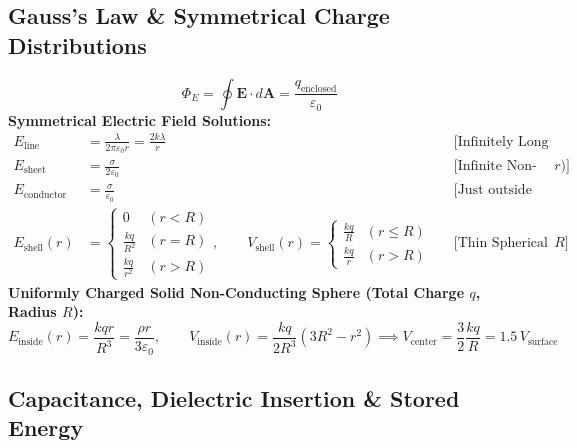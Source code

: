 \documentclass[11pt,a4paper]{article}
\begin{document}
\subsection{Gauss's Law \& Symmetrical Charge Distributions}

\begin{formulabox}
\begin{equation}
  \Phi_E = \oint \mathbf{E}\cdot d\mathbf{A} = \frac{q_{\text{enclosed}}}{\varepsilon_0}
\end{equation}
\textbf{Symmetrical Electric Field Solutions:}
\begin{align}
  E_{\text{line}} &= \frac{\lambda}{2\pi\varepsilon_0 r} = \frac{2k\lambda}{r} && \text{[Infinitely Long Uniform Line Charge]} \\
  E_{\text{sheet}} &= \frac{\sigma}{2\varepsilon_0} && \text{[Infinite Non-Conducting Plane Sheet (independent of $r$)]} \\
  E_{\text{conductor}} &= \frac{\sigma}{\varepsilon_0} && \text{[Just outside any charged conducting surface]} \\
  E_{\text{shell}}(r) &= \begin{cases} 0 & (r < R) \\ \frac{kq}{R^2} & (r = R) \\ \frac{kq}{r^2} & (r > R) \end{cases}, \qquad V_{\text{shell}}(r) = \begin{cases} \frac{kq}{R} & (r \le R) \\ \frac{kq}{r} & (r > R) \end{cases} && \text{[Thin Spherical Shell of Radius } R\text{]}
\end{align}
\textbf{Uniformly Charged Solid Non-Conducting Sphere (Total Charge $q$, Radius $R$):}
\begin{equation}
  E_{\text{inside}}(r) = \frac{k q r}{R^3} = \frac{\rho r}{3\varepsilon_0}, \qquad V_{\text{inside}}(r) = \frac{kq}{2R^3}(3R^2 - r^2) \implies V_{\text{center}} = \frac{3}{2}\frac{kq}{R} = 1.5\,V_{\text{surface}}
\end{equation}
\end{formulabox}

\subsection{Capacitance, Dielectric Insertion \& Stored Energy}
\end{document}
